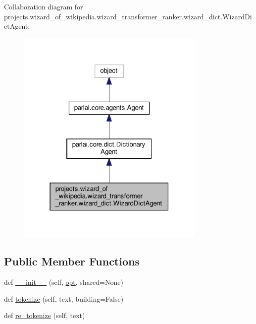 Collaboration diagram for projects.\+wizard\+\_\+of\+\_\+wikipedia.\+wizard\+\_\+transformer\+\_\+ranker.\+wizard\+\_\+dict.\+Wizard\+Dict\+Agent\+:
\nopagebreak
\begin{figure}[H]
\begin{center}
\leavevmode
\includegraphics[width=259pt]{da/d4e/classprojects_1_1wizard__of__wikipedia_1_1wizard__transformer__ranker_1_1wizard__dict_1_1WizardDictAgent__coll__graph}
\end{center}
\end{figure}
\subsection*{Public Member Functions}
\begin{DoxyCompactItemize}
\item 
def \hyperlink{classprojects_1_1wizard__of__wikipedia_1_1wizard__transformer__ranker_1_1wizard__dict_1_1WizardDictAgent_abe32022c2dd77bd34b1185c81f512940}{\+\_\+\+\_\+init\+\_\+\+\_\+} (self, \hyperlink{classprojects_1_1wizard__of__wikipedia_1_1wizard__transformer__ranker_1_1wizard__dict_1_1WizardDictAgent_a831fb6427bb524c6ffdb0ceb287f53ae}{opt}, shared=None)
\item 
def \hyperlink{classprojects_1_1wizard__of__wikipedia_1_1wizard__transformer__ranker_1_1wizard__dict_1_1WizardDictAgent_a314852ee65380b494e078d51d73c0767}{tokenize} (self, text, building=False)
\item 
def \hyperlink{classprojects_1_1wizard__of__wikipedia_1_1wizard__transformer__ranker_1_1wizard__dict_1_1WizardDictAgent_ae65c7bad18faeb4fa72fb2448e123a33}{re\+\_\+tokenize} (self, text)
\end{DoxyCompactItemize}
